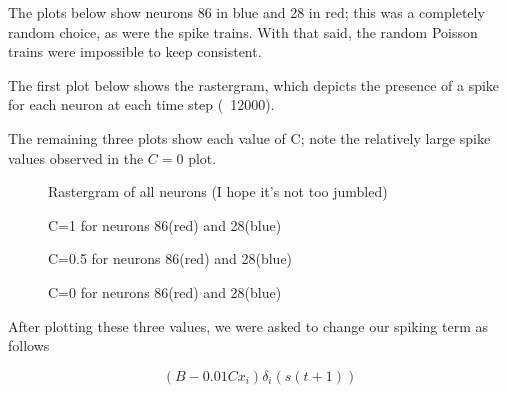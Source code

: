 \documentclass[a4paper,12pt]{article}
\begin{document}
The plots below show neurons 86 in blue and 28 in red; this was a completely random choice, as were the spike trains. With that said, the random Poisson trains were impossible to keep consistent. 

\vspace{2mm}

The first plot below shows the rastergram, which depicts the presence of a spike for each neuron at each time step (~12000). 

\vspace{2mm}

The remaining three plots show each value of C; note the relatively large spike values observed in the $C=0$ plot.

\vfil\eject
 \begin{center}
\begin{figure}[h!]
\caption{\label{pict1}Rastergram of all neurons (I hope it's not too jumbled)}
\end{figure}

\begin{figure}[h!]
\caption{\label{pict1}C=1 for neurons 86(red) and 28(blue)}
\end{figure}

\begin{figure}[h!]
\caption{\label{pict1}C=0.5 for neurons 86(red) and 28(blue)}
\end{figure}

\begin{figure}[h!]
\caption{\label{pict1}C=0 for neurons 86(red) and 28(blue)}
\end{figure}
\end{center}

\vfil\eject

After plotting these three values, we were asked to change our spiking term as follows

\begin{equation}
(B-0.01Cx_i)\delta_i(s(t+1))
\end{equation}
\end{document}
